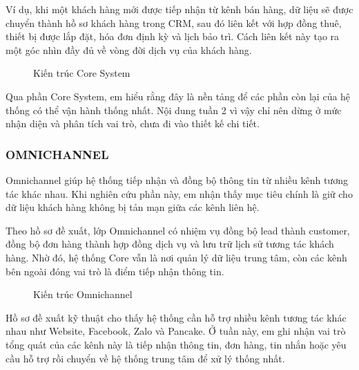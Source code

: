 Ví dụ, khi một khách hàng mới được tiếp nhận từ kênh bán hàng, dữ liệu sẽ được chuyển thành hồ sơ khách hàng trong CRM, sau đó liên kết với hợp đồng thuê, thiết bị được lắp đặt, hóa đơn định kỳ và lịch bảo trì. Cách liên kết này tạo ra một góc nhìn đầy đủ về vòng đời dịch vụ của khách hàng.

\begin{figure}[H]
    \centering
    \caption{Kiến trúc Core System}
    \label{fig:core_system}
\end{figure}


Qua phần Core System, em hiểu rằng đây là nền tảng để các phần còn lại của hệ thống có thể vận hành thống nhất. Nội dung tuần 2 vì vậy chỉ nên dừng ở mức nhận diện và phân tích vai trò, chưa đi vào thiết kế chi tiết.

\subsubsection{OMNICHANNEL}


Omnichannel giúp hệ thống tiếp nhận và đồng bộ thông tin từ nhiều kênh tương tác khác nhau. Khi nghiên cứu phần này, em nhận thấy mục tiêu chính là giữ cho dữ liệu khách hàng không bị tản mạn giữa các kênh liên hệ.

Theo hồ sơ đề xuất, lớp Omnichannel có nhiệm vụ đồng bộ lead thành customer, đồng bộ đơn hàng thành hợp đồng dịch vụ và lưu trữ lịch sử tương tác khách hàng. Nhờ đó, hệ thống Core vẫn là nơi quản lý dữ liệu trung tâm, còn các kênh bên ngoài đóng vai trò là điểm tiếp nhận thông tin.

\begin{figure}[H]
    \centering
    \caption{Kiến trúc Omnichannel}
    \label{fig:omnichannel}
\end{figure}


Hồ sơ đề xuất kỹ thuật cho thấy hệ thống cần hỗ trợ nhiều kênh tương tác khác nhau như Website, Facebook, Zalo và Pancake. Ở tuần này, em ghi nhận vai trò tổng quát của các kênh này là tiếp nhận thông tin, đơn hàng, tin nhắn hoặc yêu cầu hỗ trợ rồi chuyển về hệ thống trung tâm để xử lý thống nhất.


